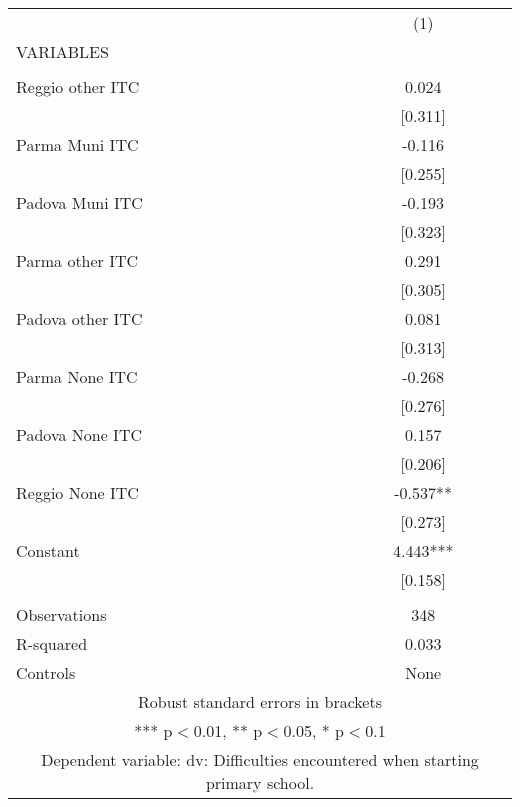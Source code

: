 \begin{tabular}{lc} \hline
 & (1) \\
VARIABLES &  \\ \hline
 &  \\
Reggio other ITC & 0.024 \\
 & [0.311] \\
Parma Muni ITC & -0.116 \\
 & [0.255] \\
Padova Muni ITC & -0.193 \\
 & [0.323] \\
Parma other ITC & 0.291 \\
 & [0.305] \\
Padova other ITC & 0.081 \\
 & [0.313] \\
Parma None ITC & -0.268 \\
 & [0.276] \\
Padova None ITC & 0.157 \\
 & [0.206] \\
Reggio None ITC & -0.537** \\
 & [0.273] \\
Constant & 4.443*** \\
 & [0.158] \\
 &  \\
Observations & 348 \\
R-squared & 0.033 \\
 Controls & None \\ \hline
\multicolumn{2}{c}{ Robust standard errors in brackets} \\
\multicolumn{2}{c}{ *** p$<$0.01, ** p$<$0.05, * p$<$0.1} \\
\multicolumn{2}{c}{ Dependent variable: dv: Difficulties encountered when starting primary school.} \\
\end{tabular}
